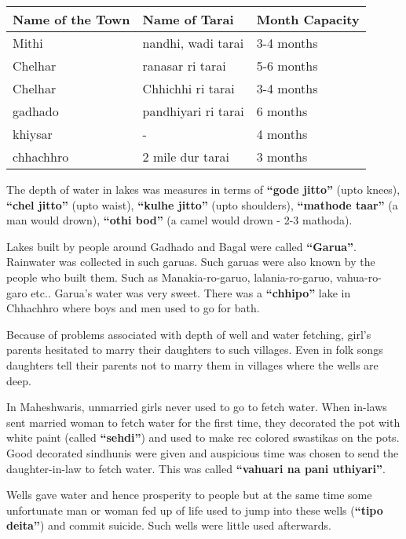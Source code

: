 \begin{center}
\begin{tabular}{l|l|l}
\hline
\textbf{Name of the Town} & \textbf{Name of Tarai} & \textbf{Month Capacity} \\
\hline
Mithi & nandhi, wadi tarai & 3-4 months \\ 
Chelhar & ranasar ri tarai & 5-6 months \\ 
Chelhar & Chhichhi ri tarai & 3-4 months \\ 
gadhado & pandhiyari ri tarai & 6 months \\ 
khiysar & - & 4 months \\ 
chhachhro & 2 mile dur tarai & 3 months \\ 
\hline
\end{tabular}
\end{center}

The depth of water in lakes was measures in terms of \textbf{``gode jitto''} (upto knees), \textbf{``chel jitto''} (upto waist), \textbf{``kulhe jitto''} (upto shoulders), \textbf{``mathode taar''} (a man would drown), \textbf{``othi bod''} (a camel would drown - 2-3 mathoda).

Lakes built by people around Gadhado and Bagal were called \textbf{``Garua''}. Rainwater was collected in such garuas. Such garuas were also known by the people who built them. Such as Manakia-ro-garuo, lalania-ro-garuo, vahua-ro-garo etc.. Garua's water was very sweet. There was a \textbf{``chhipo''} lake in Chhachhro where boys and men used to go for bath.

Because of problems associated with depth of well and water fetching, girl's parents hesitated to marry their daughters to such villages. Even in folk songs daughters tell their parents not to marry them in villages where the wells are deep.

In Maheshwaris, unmarried girls never used to go to fetch water. When in-laws sent married woman to fetch water for the first time, they decorated the pot with white paint (called \textbf{``sehdi''}) and used to make rec colored swastikas on the pots. Good decorated sindhunis were given and auspicious time was chosen to send the daughter-in-law to fetch water. This was called \textbf{``vahuari na pani uthiyari''}.

Wells gave water and hence prosperity to people but at the same time some unfortunate man or woman fed up of life used to jump into these wells (\textbf{``tipo deita''}) and commit suicide. Such wells were little used afterwards.
